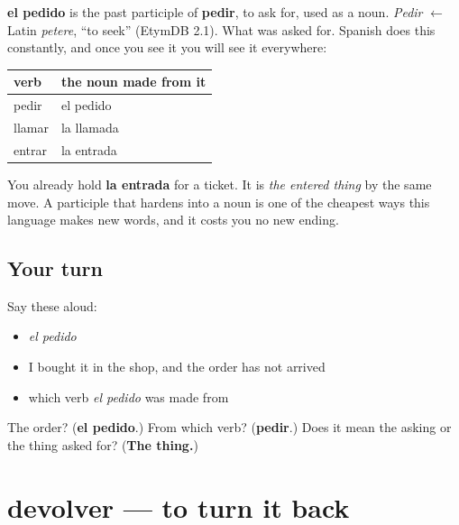 \begin{cousinweb}
\textbf{el pedido} is the past participle of \textbf{pedir}, to ask for, used as a noun. \emph{Pedir} $\leftarrow$ Latin \emph{petere}, \textquotedblleft{}to seek\textquotedblright{} (EtymDB 2.1). What was asked for. Spanish does this constantly, and once you see it you will see it everywhere:

\noindent
\begin{tabularx}{\linewidth}{@{}>{\raggedright\arraybackslash}X>{\raggedright\arraybackslash}X@{}}
\toprule
\textbf{verb} & \textbf{the noun made from it} \\
\midrule
pedir & el pedido \\
llamar & la llamada \\
entrar & la entrada \\
\bottomrule
\end{tabularx}

You already hold \textbf{la entrada} for a ticket. It is \emph{the entered thing} by the same move. A participle that hardens into a noun is one of the cheapest ways this language makes new words, and it costs you no new ending.
\end{cousinweb}

\subsection*{Your turn}
Say these aloud:

\begin{itemize}
\raggedright
  \item \emph{el pedido}
  \item I bought it in the shop, and the order has not arrived
  \item which verb \emph{el pedido} was made from
\end{itemize}

\begin{tcolorbox}[breakable,colback=teal!4,colframe=teal!35!black,title={Before you move on}]
The order? (\textbf{el pedido}.) From which verb? (\textbf{pedir}.) Does it mean the asking or the thing asked for? (\textbf{The thing.})
\end{tcolorbox}
\section[devolver]{devolver — to turn it back}

\label{lesson:ES-C431-devolver}



